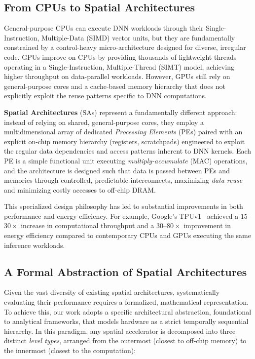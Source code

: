 \subsection{From CPUs to Spatial Architectures}
\label{sec:cpu-gpu-sa}

General-purpose CPUs can execute DNN workloads through their Single-Instruction, Multiple-Data (SIMD)
vector units, but they are fundamentally constrained by a control-heavy
micro-architecture designed for diverse, irregular code.
GPUs improve on CPUs by providing thousands of lightweight threads
operating in a Single-Instruction, Multiple-Thread (SIMT) model,
achieving higher throughput on data-parallel workloads.
However, GPUs still rely on general-purpose cores and a cache-based
memory hierarchy that does not explicitly exploit the reuse patterns
specific to DNN computations.

\textbf{Spatial Architectures} (SAs) represent a fundamentally different
approach: instead of relying on shared, general-purpose cores, they
employ a multidimensional array of dedicated \emph{Processing Elements}
(PEs) paired with an explicit on-chip memory hierarchy
(registers, scratchpads) engineered to exploit the regular
data dependencies and access patterns inherent to DNN kernels.
Each PE is a simple functional unit executing \emph{multiply-accumulate}
(MAC) operations, and the architecture is designed such that data is
passed between PEs and memories through controlled, predictable
interconnects, maximizing \emph{data reuse} and minimizing costly
accesses to off-chip DRAM.

This specialized design philosophy has led to substantial improvements
in both performance and energy efficiency.
For example, Google's TPUv1~\cite{tpu} achieved a
$15$--$30\times$ increase in computational throughput and a
$30$--$80\times$ improvement in energy efficiency compared to
contemporary CPUs and GPUs executing the same inference workloads.


\subsection{A Formal Abstraction of Spatial Architectures }
\label{sec:bg-sa-abstraction}

Given the vast diversity of existing spatial architectures, systematically evaluating their performance requires a formalized, mathematical representation. To achieve this, our work adopts a specific architectural abstraction, foundational to analytical frameworks, that models hardware as a strict temporally sequential hierarchy. In this paradigm, any spatial accelerator is decomposed into three distinct \textit{level types}, arranged from the outermost (closest to off-chip memory) to the innermost (closest to the computation):  

